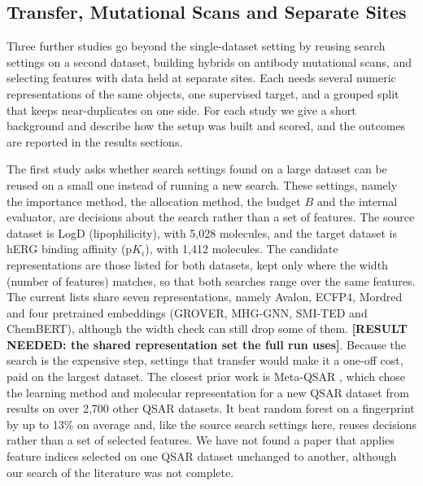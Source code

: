 \subsection{Transfer, Mutational Scans and Separate Sites}

Three further studies go beyond the single-dataset setting by reusing search settings on a second dataset, building hybrids on antibody mutational scans, and selecting features with data held at separate sites. Each needs several numeric representations of the same objects, one supervised target, and a grouped split that keeps near-duplicates on one side. For each study we give a short background and describe how the setup was built and scored, and the outcomes are reported in the results sections.

The first study asks whether search settings found on a large dataset can be reused on a small one instead of running a new search. These settings, namely the importance method, the allocation method, the budget $B$ and the internal evaluator, are decisions about the search rather than a set of features. The source dataset is LogD (lipophilicity), with 5,028 molecules, and the target dataset is hERG binding affinity ($\mathrm{p}K_i$), with 1,412 molecules. The candidate representations are those listed for both datasets, kept only where the width (number of features) matches, so that both searches range over the same features. The current lists share seven representations, namely Avalon, ECFP4, Mordred and four pretrained embeddings (GROVER, MHG-GNN, SMI-TED and ChemBERT), although the width check can still drop some of them. \textbf{[RESULT NEEDED: the shared representation set the full run uses]}. Because the search is the expensive step, settings that transfer would make it a one-off cost, paid on the largest dataset. The closest prior work is Meta-QSAR \citep{Olier2018}, which chose the learning method and molecular representation for a new QSAR dataset from results on over 2,700 other QSAR datasets. It beat random forest on a fingerprint by up to 13\% on average and, like the source search settings here, reuses decisions rather than a set of selected features. We have not found a paper that applies feature indices selected on one QSAR dataset unchanged to another, although our search of the literature was not complete.

